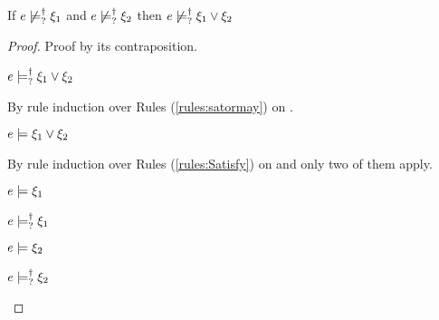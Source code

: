 \begin{lem}
  \label{lem:or-nn-satisfy}
  If $e \not\models_{?}^{\dag} \xi_1$ and $e \not\models_{?}^{\dag} \xi_2$ then $e \not\models_{?}^{\dag} \xi_1 \vee \xi_2$
\end{lem}
\begin{proof}
Proof by its contraposition.
\begin{pfsteps*}
\item $e \models_{?}^{\dag} \xi_1 \vee \xi_2$  
\end{pfsteps*}
By rule induction over Rules (\ref{rules:satormay}) on .
\begin{byCases}
\item[\text{(\ref{rule:CMSMust})}]
  \begin{pfsteps*}
  \item $e \models \xi_1 \vee \xi_2$  
  \end{pfsteps*}
  By rule induction over Rules (\ref{rules:Satisfy}) on  and only two of them apply.
  \begin{byCases}
  \item[\text{(\ref{rule:CSOr1})}]
    \begin{pfsteps*}
    \item $e \models \xi_1$  
    \item $e \models_{?}^{\dag} \xi_1$ 
    \end{pfsteps*}
  \item[\text{(\ref{rule:CSOr2})}]
    \begin{pfsteps*}
    \item $e \models \xi_2$  
    \item $e \models_{?}^{\dag} \xi_2$ 
    \end{pfsteps*}
  \end{byCases}


\end{byCases}
\end{proof}
